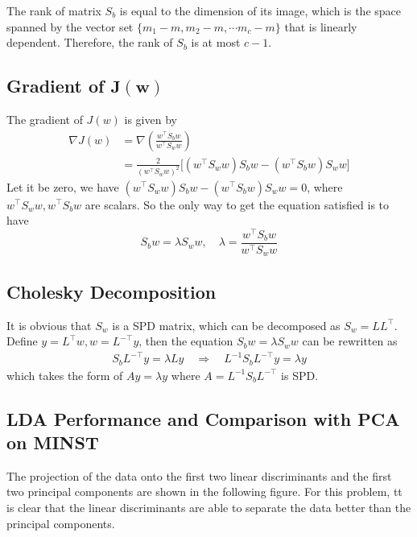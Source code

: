 \documentclass[12pt]{article}
\newcommand{\0}{\boldsymbol{0}}
\begin{document}
The rank of matrix $S_b$ is equal to the dimension of its image, which is the space spanned by the vector set $\{m_1 - m, m_2 - m,\cdots m_c-m\}$ that is linearly dependent. Therefore, the rank of $S_b$ is at most $c-1$.

\subsection{Gradient of $\mathbf{J(w)}$}

The gradient of $J(w)$ is given by
\begin{align*}
    \nabla J(w) &= \nabla \left(\frac{w^\top S_b w}{w^\top S_w w}\right)\\
    &= \frac{2}{(w^\top S_w w)^2} \bigg[ (w^\top S_w w) S_b w - (w^\top S_b w) S_w w \bigg]
\end{align*}
Let it be zero, we have $(w^\top S_w w) S_b w - (w^\top S_b w) S_w w = 0$, where $w^\top S_w w, w^\top S_b w$ are scalars. So the only way to get the equation satisfied is to have 
\[
    S_b w = \lambda S_w w, \quad \lambda = \frac{w^\top S_b w}{w^\top S_w w}
\]

\subsection{Cholesky Decomposition}

It is obvious that $S_w$ is a SPD matrix, which can be decomposed as $S_w = L L^\top$. Define $y = L^\top w, w = L^{-\top} y$, then the equation $S_b w = \lambda S_w w$ can be rewritten as
\begin{align*}
    S_b L^{-\top} y = \lambda L y \quad \Rightarrow \quad  L^{-1} S_b L^{-\top} y = \lambda y
\end{align*}
which takes the form of $Ay = \lambda y$ where $A = L^{-1} S_b L^{-\top}$ is SPD.
    
\subsection{LDA Performance and Comparison with PCA on MINST}

The projection of the data onto the first two linear discriminants and the first two principal components are shown in the following figure. For this problem, tt is clear that the linear discriminants are able to separate the data better than the principal components.
\end{document}
